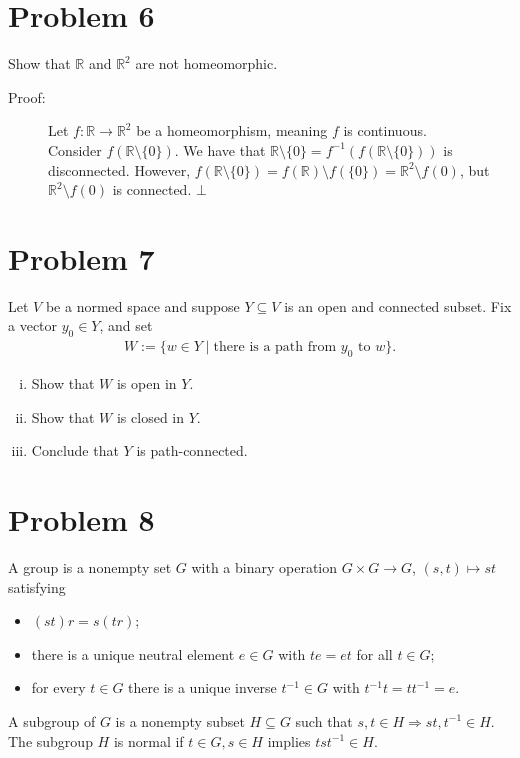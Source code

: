 \documentclass[8pt]{extarticle}
\newcommand{\R}{\mathbb{R}}
\begin{document}
  \section{Problem 6}%
  Show that $\R$ and $\R^2$ are not homeomorphic.
  \begin{description}
    \item[Proof:] Let $f: \R\rightarrow \R^2$ be a homeomorphism, meaning $f$ is continuous.\\

      Consider $f(\R\setminus \{0\})$. We have that $\R\setminus \{0\} = f^{-1}\left(f(\R\setminus \{0\})\right)$ is disconnected. However, $f(\R\setminus \{0\}) = f(\R)\setminus f(\{0\}) = \R^2\setminus f(0)$, but $\R^2\setminus f(0)$ is connected. $\bot$
  \end{description}
  \section{Problem 7}%
  Let $V$ be a normed space and suppose $Y\subseteq V$ is an open and connected subset. Fix a vector $y_0\in Y$, and set
  \begin{align*}
    W := \{w\in Y\mid \text{there is a path from $y_0$ to $w$}\}.
  \end{align*}
  \begin{enumerate}[(i)]
    \item Show that $W$ is open in $Y$.
    \item Show that $W$ is closed in $Y$.
    \item Conclude that $Y$ is path-connected.
  \end{enumerate}
  \section{Problem 8}%
  A group is a nonempty set $G$ with a binary operation $G\times G \rightarrow G$, $(s,t)\mapsto st$ satisfying
  \begin{itemize}
    \item $(st)r = s(tr)$;
    \item there is a unique neutral element $e\in G$ with $te = et$ for all $t\in G$;
    \item for every $t\in G$ there is a unique inverse $t^{-1}\in G$ with $t^{-1}t = tt^{-1} = e$.
  \end{itemize}
  A subgroup of $G$ is a nonempty subset $H\subseteq G$ such that $s,t\in H \Rightarrow st,t^{-1}\in H$. The subgroup $H$ is normal if $t\in G,s\in H$ implies $tst^{-1}\in H$.\\
\end{document}
